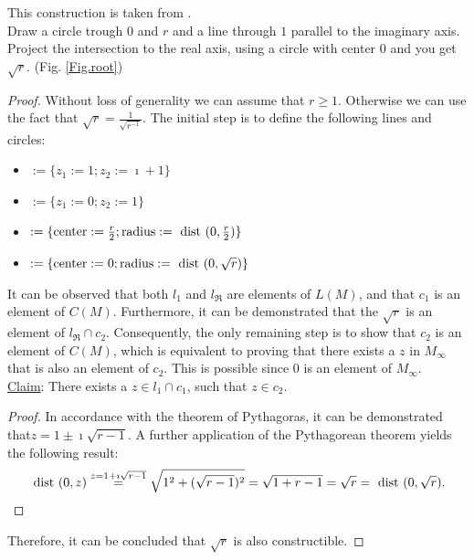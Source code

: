 This construction is taken from  \cite{JAN_SCHRÖER:2023}.\\
Draw a circle trough $0$ and $r$ and a line through $1$ parallel to the imaginary axis. Project the intersection to the real axis, using a circle with center $0$ and you get $\sqrt{r}$. (Fig. \ref{Fig.root})
\begin{proof}
    \leanok
Without loss of generality we can assume that $r \ge 1$. 
Otherwise we can use the fact that $\sqrt{r} = \frac{1}{\sqrt{r^{-1}}}$.
The initial step is to define the following lines and circles:
\begin{itemize}
    \item [$l_1$] $:= \{z_1 :=1; z_2 := \imath + 1\}$
    \item [$l_{\Re}$] $:= \{z_1:=0; z_2:= 1\}$
    \item [$c_1$] $:= \{\text{center}:= \frac{r}{2}; \text{radius} := \text{ dist } (0,\frac{r}{2})\}$
    \item [$c_2$] $:= \{\text{center}:= 0; \text{radius} := \text{ dist } (0,\sqrt{r})\}$
\end{itemize}
It can be observed that both $l_1$ and $l_{\Re}$ are elements of $L(M)$, and that $c_1$ is an element of $C(M)$. 
Furthermore, it can be demonstrated that the $\sqrt{r}$  is an element of $l_{\Re} \cap c_2$. 
Consequently, the only remaining step is to show that $c_2$ is an element of $C(M)$, which is equivalent to proving that there exists a $z$ in $M_{\infty}$ that is also an element of $c_2$. 
This is possible since $0$ is an element of $M_{\infty}$.\\
\underline{Claim}: There exists a $z \in l_1 \cap c_1$, such that $z \in c_2$.
\begin{proof}
    In accordance with the theorem of Pythagoras, it can be demonstrated that$z= 1 \pm \imath \sqrt{r-1}$.
    A further application of the Pythagorean theorem yields the following result: 
    $$\text{ dist } (0,z) \overset{z= 1 + \imath \sqrt{r-1}}{=} \sqrt{1^2 + (\sqrt{r-1})^2} = \sqrt{1 + r - 1} = \sqrt{r} = \text{ dist } (0,\sqrt{r}).$$
\end{proof}
Therefore, it can be concluded that $\sqrt{r}$ is also constructible.

\end{proof}
